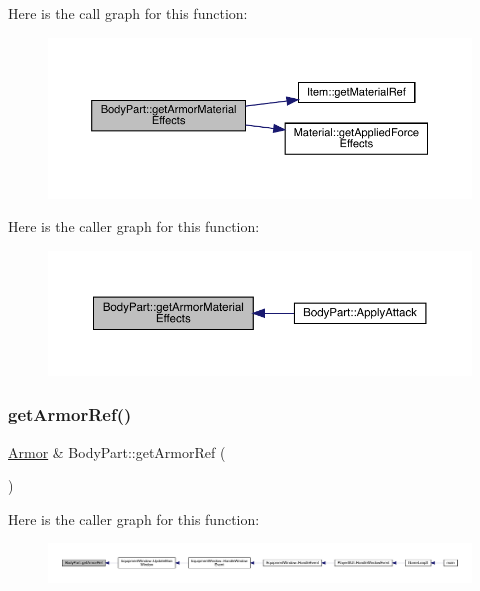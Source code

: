 Here is the call graph for this function\+:
\nopagebreak
\begin{figure}[H]
\begin{center}
\leavevmode
\includegraphics[width=350pt]{d2/d6f/class_body_part_a7c4d742811e49a2c97b9bec6c1785e94_cgraph}
\end{center}
\end{figure}
Here is the caller graph for this function\+:
\nopagebreak
\begin{figure}[H]
\begin{center}
\leavevmode
\includegraphics[width=350pt]{d2/d6f/class_body_part_a7c4d742811e49a2c97b9bec6c1785e94_icgraph}
\end{center}
\end{figure}
\mbox{\label{class_body_part_a0398943f64891c99b3a05f20baeccd55}} 
\subsubsection{\texorpdfstring{get\+Armor\+Ref()}{getArmorRef()}}
{\footnotesize\ttfamily \mbox{\hyperlink{class_armor}{Armor}} \& Body\+Part\+::get\+Armor\+Ref (\begin{DoxyParamCaption}{ }\end{DoxyParamCaption})}

Here is the caller graph for this function\+:
\nopagebreak
\begin{figure}[H]
\begin{center}
\leavevmode
\includegraphics[width=350pt]{d2/d6f/class_body_part_a0398943f64891c99b3a05f20baeccd55_icgraph}
\end{center}
\end{figure}
\mbox{\label{class_body_part_af5a68e571235e6b4e8cd6a13ec94bab3}} 
